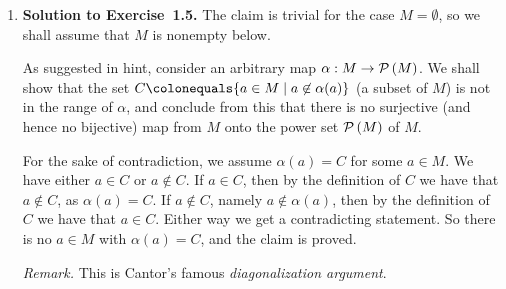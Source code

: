 \begin{enumerate}[1.]
%
\item \textbf{Solution to Exercise~1.5.} The claim is trivial for the case $M = \emptyset$, so we shall assume that $M$ is nonempty below.\par
As suggested in hint, consider an arbitrary map $\alpha: M \to {\mathcal{P}\left(M\right)}$. We shall show that the set $C \colonequals \setm{a \in M}{a \not\in \alpha(a)}$ (a subset of $M$) is not in the range of $\alpha$, and conclude from this that there is no surjective (and hence no bijective) map from $M$ onto the power set ${\mathcal{P}\left(M\right)}$ of $M$.\par
For the sake of contradiction, we assume $\alpha(a) = C$ for some $a \in M$. We have either $a \in C$ or $a \not\in C$. If $a \in C$, then by the definition of $C$ we have that $a \not\in C$, as $\alpha(a) = C$. If $a \not\in C$, namely $a \not\in \alpha(a)$, then by the definition of $C$ we have that $a \in C$. Either way we get a contradicting statement. So there is no $a \in M$ with $\alpha(a) = C$, and the claim is proved.\par
\textit{Remark.} This is Cantor's famous \emph{diagonalization argument}.
%
\end{enumerate}
%

